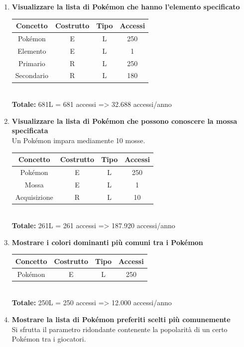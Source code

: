 \documentclass[a4paper,12pt]{report}
\begin{document}
\begin{enumerate}
  \item \textbf{Visualizzare la lista di Pokémon che hanno l'elemento specificato}
  
  \begin{tabular}{|c|c|c|c|}
    \hline
  	\rowcolor{gray!30}Concetto & Costrutto & Tipo & Accessi \\
    \hline
    Pokémon & E & L & 250 \\
  	\hline
    Elemento & E & L & 1 \\
    \hline
    Primario & R & L & 250 \\
    \hline
    Secondario & R & L & 180 \\
    \hline
  \end{tabular} \\
  
  \textbf{Totale:} 681L = 681 accessi => 32.688 accessi/anno
  
  \item \textbf{Visualizzare la lista di Pokémon che possono conoscere la mossa specificata} \\
  Un Pokémon impara mediamente 10 mosse.
  
  \begin{tabular}{|c|c|c|c|}
  	\hline
  	\rowcolor{gray!30}Concetto & Costrutto & Tipo & Accessi \\
    \hline
    Pokémon & E & L & 250 \\
  	\hline
    Mossa & E & L & 1 \\
    \hline
    Acquisizione & R & L & 10 \\
    \hline
  \end{tabular} \\
  
  \textbf{Totale:} 261L = 261 accessi => 187.920 accessi/anno
  
  \item \textbf{Mostrare i colori dominanti più comuni tra i Pokémon}
  
  \begin{tabular}{|c|c|c|c|}
  	\hline
  	\rowcolor{gray!30}Concetto & Costrutto & Tipo & Accessi \\
    \hline
    Pokémon & E & L & 250 \\
  	\hline
  \end{tabular} \\
  
  \textbf{Totale:} 250L = 250 accessi => 12.000 accessi/anno
  
  \item \textbf{Mostrare la lista di Pokémon preferiti scelti più comunemente} \\
  Si sfrutta il parametro ridondante contenente la popolarità di un certo Pokémon tra i giocatori.


\end{enumerate}
\end{document}
